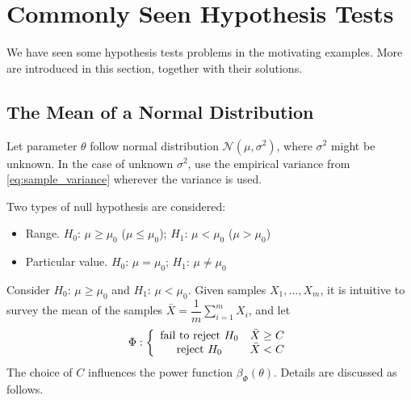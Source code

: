 \section{Commonly Seen Hypothesis Tests}

We have seen some hypothesis tests problems in the motivating examples. More are introduced in this section, together with their solutions.

\subsection{The Mean of a Normal Distribution}

Let parameter $\theta$ follow normal distribution $\mathcal{N}(\mu,\sigma^2)$, where $\sigma^2$ might be unknown. In the case of unknown $\sigma^2$, use the empirical variance from \eqref{eq:sample_variance} wherever the variance is used.

Two types of null hypothesis are considered:
\begin{itemize}
	\item Range. $H_0$: $\mu \geq \mu_0$ ($\mu \leq \mu_0$); $H_1$: $\mu < \mu_0$ ($\mu > \mu_0$)
	\item Particular value. $H_0$: $\mu = \mu_0$; $H_1$: $\mu \neq \mu_0$
\end{itemize}

Consider $H_0$: $\mu \geq \mu_0$ and  $H_1$: $\mu < \mu_0$. Given samples $X_1,\ldots,X_m$, it is intuitive to survey the mean of the samples $\bar{X}=\dfrac{1}{m}\sum_{i=1}^{m}X_i$, and let
\begin{eqnarray}
	\Phi : \left\{\begin{array}{cc}
		\textup{fail to reject~} H_0 & \bar{X} \geq C \\
		\textup{reject~} H_0 & \bar{X} < C
	\end{array}\right. \label{eq:hypotest_normal_1}
\end{eqnarray}
The choice of $C$ influences the power function $\beta_{\Phi}(\theta)$. Details are discussed as follows.

